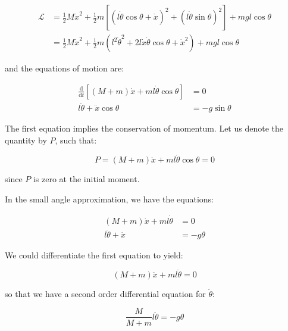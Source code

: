\documentclass[12pt]{article}
\begin{document}
\begin{equation}
\begin{split}
    \mathcal{L} &= \frac{1}{2} M \dot{x}^{2} + \frac{1}{2} m \left[ (l \dot{\theta} \cos{\theta} + \dot{x})^{2} + (l \dot{\theta} \sin{\theta})^{2} \right] + mgl \cos{\theta} \\
    &= \frac{1}{2} M \dot{x}^{2} + \frac{1}{2} m \left( l^{2} \dot{\theta}^{2} + 2l \dot{x} \dot{\theta} \cos{\theta} + \dot{x}^{2} \right) + mgl \cos{\theta}
\end{split}
\end{equation}

and the equations of motion are:

\begin{equation}
\begin{split}
    \frac{\mathrm{d}}{\mathrm{d}t} \left[ (M + m) \dot{x} + ml \dot{\theta} \cos{\theta} \right] &= 0 \\
    l \ddot{\theta} + \ddot{x} \cos{\theta} &= -g \sin{\theta}
\end{split}
\end{equation}

The first equation implies the conservation of momentum. Let us denote the quantity by $P$, such that:

\begin{equation}
    P =  (M + m) \dot{x} + ml \dot{\theta} \cos{\theta} = 0
\end{equation}

since $P$ is zero at the initial moment.

In the small angle approximation, we have the equations:

\begin{equation}
\begin{split}
    (M + m) \dot{x} + ml \dot{\theta} &= 0 \\
    l \ddot{\theta} + \ddot{x} &= -g \theta
\end{split}
\end{equation}

We could differentiate the first equation to yield:

\begin{equation}
    (M + m) \ddot{x} + ml \ddot{\theta} = 0
\end{equation}

so that we have a second order differential equation for $\ddot{\theta}$:

\begin{equation}
    \frac{M}{M + m} l \ddot{\theta} = -g \theta
\end{equation}
\end{document}
